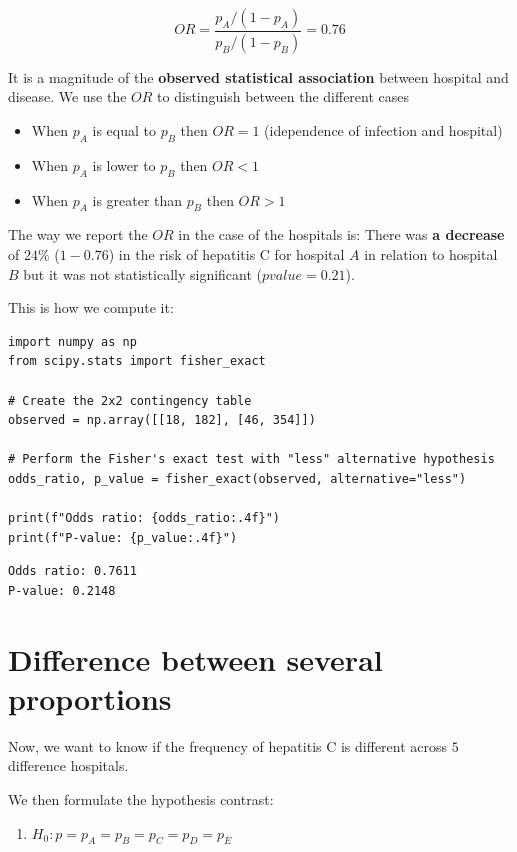 \documentclass[
]{book}
\providecommand{\tightlist}{%
  \setlength{\itemsep}{0pt}\setlength{\parskip}{0pt}}
\begin{document}
\[OR=\frac{p_A/(1-p_A)}{p_B/(1-p_B)}=0.76\]

It is a magnitude of the \textbf{observed statistical association} between hospital and disease. We use the \(OR\) to distinguish between the different cases

\begin{itemize}
\tightlist
\item
  When \(p_A\) is equal to \(p_B\) then \(OR=1\) (idependence of infection and hospital)
\item
  When \(p_A\) is lower to \(p_B\) then \(OR<1\)
\item
  When \(p_A\) is greater than \(p_B\) then \(OR>1\)
\end{itemize}

The way we report the \(OR\) in the case of the hospitals is: There was \textbf{a decrease} of \(24\%\) (\(1-0.76\)) in the risk of hepatitis C for hospital \(A\) in relation to hospital \(B\) but it was not statistically significant (\(pvalue=0.21\)).

This is how we compute it:

\begin{verbatim}
import numpy as np
from scipy.stats import fisher_exact

# Create the 2x2 contingency table
observed = np.array([[18, 182], [46, 354]])

# Perform the Fisher's exact test with "less" alternative hypothesis
odds_ratio, p_value = fisher_exact(observed, alternative="less")

print(f"Odds ratio: {odds_ratio:.4f}")
print(f"P-value: {p_value:.4f}")
\end{verbatim}

\begin{verbatim}
Odds ratio: 0.7611
P-value: 0.2148
\end{verbatim}

\hypertarget{difference-between-several-proportions}{%
\section{Difference between several proportions}\label{difference-between-several-proportions}}

Now, we want to know if the frequency of hepatitis C is different across \(5\) difference hospitals.

We then formulate the hypothesis contrast:

\begin{enumerate}
\def\labelenumi{\alph{enumi}.}
\tightlist
\item
  \(H_0: p=p_A=p_B=p_C=p_D=p_E\)
\end{enumerate}
\end{document}
